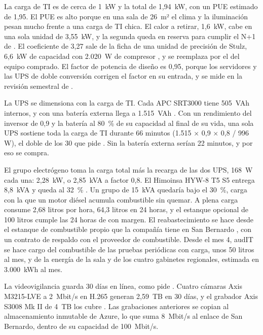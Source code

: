 La carga de TI es de cerca de 1~kW y la total de 1,94~kW, con un PUE estimado de 1,95. El PUE es alto
porque en una sala de 26~m² el clima y la iluminación pesan mucho frente a una carga de TI chica. El
calor a retirar, 1,6~kW, cabe en una sola unidad de 3,55~kW, y la segunda queda en reserva para cumplir
el N+1 de . El coeficiente de 3,27 sale de la ficha de una unidad de precisión de
Stulz, 6,6~kW de capacidad con 2.020~W de compresor \parencite{stulz_minispace}, y se reemplaza por el del
equipo comprado. El factor de potencia de diseño es 0,95, porque los servidores y las UPS de doble
conversión corrigen el factor en su entrada, y se mide en la revisión semestral de
.

La UPS se dimensiona con la carga de TI. Cada APC SRT3000 tiene 505~VAh internos, y con una batería
externa llega a 1.515~VAh \parencite{apc_srt3000}. Con un rendimiento del inversor de 0,9 y la batería al
80~\% de su capacidad al final de su vida, una sola UPS sostiene toda la carga de TI durante 66 minutos
(1.515 × 0,9 × 0,8 / 996 W), el doble de los 30 que pide . Sin la batería externa
serían 22 minutos, y por eso se compra.

El grupo electrógeno toma la carga total más la recarga de las dos UPS, 168~W cada una: 2,28~kW, o
2,85~kVA a factor 0,8. El Himoinsa HYW-8 T5 S5 entrega 8,8~kVA y queda al 32~\% \parencite{himoinsa_hyw8}.
Un grupo de 15~kVA quedaría bajo el 30~\%, carga con la que un motor diésel acumula combustible sin
quemar. A plena carga consume 2,68 litros por hora, 64,3 litros en 24 horas, y el estanque opcional de
100 litros cumple las 24 horas de  con margen. El reabastecimiento se hace desde el
estanque de combustible propio que la compañía tiene en San Bernardo , con un
contrato de respaldo con el proveedor de combustible. Desde el mes 4, audIT se hace cargo del
combustible de las pruebas periódicas con carga, unos 50 litros al mes, y de la energía de la sala y de
los cuatro gabinetes regionales, estimada en 3.000~kWh al mes.

La videovigilancia guarda 30 días en línea, como pide . Cuatro cámaras Axis
M3215-LVE a 2~Mbit/s en H.265 generan 2,59~TB en 30 días, y el grabador Axis S3008 Mk II de 4~TB los
cubre \parencite{axis_m3215,axis_s3008}. Las grabaciones anteriores se copian al almacenamiento inmutable
de Azure, lo que suma 8~Mbit/s al enlace de San Bernardo, dentro de su capacidad de 100~Mbit/s.

